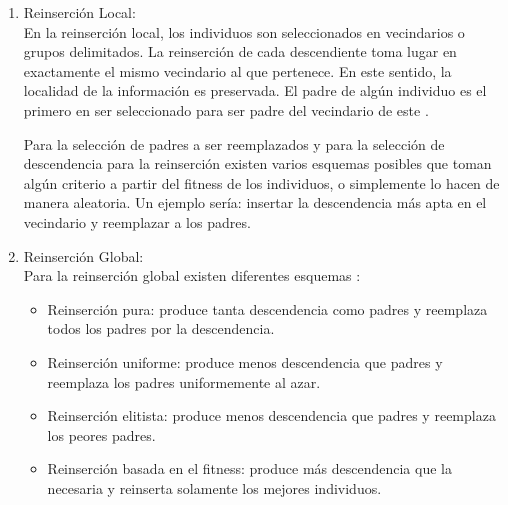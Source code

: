\begin{enumerate}

\item{Reinserción Local:}\\
En la reinserción local, los individuos son seleccionados en vecindarios o grupos delimitados. La reinserción de cada descendiente toma lugar en exactamente el mismo vecindario al que pertenece. En este sentido, la localidad de la información es preservada. El padre de algún individuo es el primero en ser seleccionado para ser padre del vecindario de este \cite{geatbx}.

Para la selección de padres  a ser reemplazados y para la selección de descendencia para la reinserción existen varios esquemas posibles que toman algún criterio a partir del fitness de los individuos, o simplemente lo hacen de manera aleatoria. Un ejemplo sería: insertar la descendencia más apta  en el vecindario y reemplazar a los padres.
    \item {Reinserción Global:}\\
Para la reinserción global existen diferentes esquemas \cite{geatbx}:

\begin{itemize}
    \item Reinserción pura: produce tanta descendencia como padres y reemplaza todos los padres por la descendencia.
    \item Reinserción uniforme: produce menos descendencia que padres y reemplaza los padres uniformemente al azar.
    \item Reinserción elitista: produce menos descendencia que padres y reemplaza los peores padres.
    \item Reinserción basada en el fitness: produce más descendencia que la necesaria y reinserta solamente los mejores individuos.
\end{itemize}


\end{enumerate}
